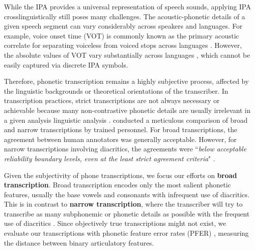 \documentclass[11pt]{article}
\begin{document}
While the IPA provides a universal representation of speech sounds, applying IPA crosslinguistically still poses many challenges. The acoustic-phonetic details of a given speech segment can vary considerably across speakers and languages. For example, voice onset time (VOT) is commonly known as the primary acoustic correlate for separating voiceless from voiced stops across languages \cite{abramson2017voice}. However, the absolute values of VOT vary substantially across languages \cite{cho1999variation, chodroff2019covariation}, which cannot be easily captured via discrete IPA symbols. %

Therefore, phonetic transcription remains a highly subjective process, affected by the linguistic backgrounds or theoretical orientations of the transcriber. In transcription practices, strict transcriptions are not always necessary or achievable because many non-contrastive phonetic details are usually irrelevant in a given analysis linguistic analysis \cite{anderson2023variation,kerswill1990validity,shriberg1991reliability}. \citet{shriberg1991reliability} conducted a meticulous comparison of broad and narrow transcriptions by trained personnel. For broad transcriptions, the agreement between human annotators was generally acceptable. However, for narrow transcriptions involving diacritics, the agreements were ``\textit{below acceptable reliability boundary levels, even at the least strict agreement criteria}" \cite{shriberg1991reliability}.

Given the subjectivity of phone transcriptions, we focus our efforts on \textbf{broad transcription}. Broad transcription encodes only the most salient phonetic features, usually the base vowels and consonants with infrequent use of diacritics.  This is in contrast to \textbf{narrow transcription}, where the transcriber will try to transcribe as many subphonemic or phonetic details as possible with the frequent use of diacritics \cite{ladefoged2014course}. Since objectively true transcriptions might not exist, we evaluate our transcriptions with phonetic feature error rates (PFER) \cite{taguchi23_interspeech}, measuring the distance between binary articulatory features.

\end{document}

